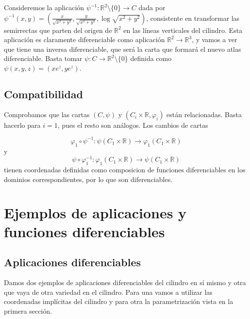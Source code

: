 \documentclass[twoside, 11pt]{article}
\theoremstyle{definition}
\newcommand{\R}{\mathbb{R}}
\begin{document}
Consideremos la aplicación $\psi^{-1}:\R^2 \setminus\{0\}\to C$ dada por $\psi^{-1}(x,y)=\left(\frac{x}{\sqrt{x^2+y^2}},\frac{y}{\sqrt{x^2+y^2}}, \log\sqrt{x^2+y^2} \right)$, consistente en transformar las semirrectas que parten del origen de $\R^2$ en las líneas verticales del cilindro. Esta aplicación es claramente diferenciable como aplicación $\R^2\to\R^3$, y vamos a ver que tiene una inversa diferenciable, que será la carta que formará el nuevo atlas diferenciable. Basta tomar $\psi:C\to\R^2\setminus\{0\}$ definida como $\psi(x,y,z)=(xe^z,ye^z)$. 

\subsection{Compatibilidad}

Comprobamos que las cartas $(C, \psi)$ y $(C_i\times\R, \varphi_i)$ están relacionadas. Basta hacerlo para $i=1$, pues el resto son análogos. Los cambios de cartas

\[
\varphi_1\circ \psi^{-1}: \psi(C_1\times\R)\to \varphi_1(C_1\times\R)
\]
y 
\[
\psi\circ\varphi_1^{-1} : \varphi_1(C_1\times\R)\to \psi(C_1\times\R)
\]
tienen coordenadas definidas como composicion de funciones diferenciables en los dominios correspondientes, por lo que son diferenciables. 

\section{Ejemplos de aplicaciones y funciones diferenciables}

\subsection{Aplicaciones diferenciables}
Damos dos ejemplos de aplicaciones diferenciables del cilindro en sí mismo y otra que vaya de otra variedad en el cilindro. Para una vamos a utilizar las coordenadas implícitas del cilindro y para otra la parametrización vista en la primera sección. 
\end{document}
